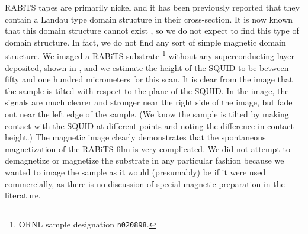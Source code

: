RABiTS tapes are primarily nickel
\cite{feldman_apl_77_2000,feldman_2000,rabits_web} and it has been
previously reported that they contain a Landau type domain 
structure \cite{landau_physzs_8_153_1935,kercher_prb_60_6878_2000} 
in their 
cross-section. It is now known that this domain structure
cannot exist \cite{arrott_physb_233_259_1997,hertel_prb_60_7366_1999}, 
so we do not expect to find
this type of domain structure. In fact, we do not find any sort of 
simple magnetic domain structure. We imaged a RABiTS substrate%
\footnote{ORNL sample designation \texttt{n020898}.}
without any
superconducting layer deposited, shown in ,
and we estimate the height of the SQUID to be between fifty and 
one hundred micrometers for this scan.  
It is clear from the image that the sample is tilted with respect
to the plane of the SQUID.
In the image, the signals
are much clearer and stronger near the right side of the image, but 
fade out near the left edge of the sample. (We know 
the sample is tilted by making contact with the SQUID at 
different points and noting the difference in contact height.)
The magnetic image clearly demonstrates that the spontaneous
magnetization of the RABiTS film is very complicated. 
We did not attempt to demagnetize or magnetize the substrate in any
particular fashion because we wanted to image
the sample as it would (presumably) be if it were used commercially,
as there is no discussion of special magnetic preparation in the 
literature. 

